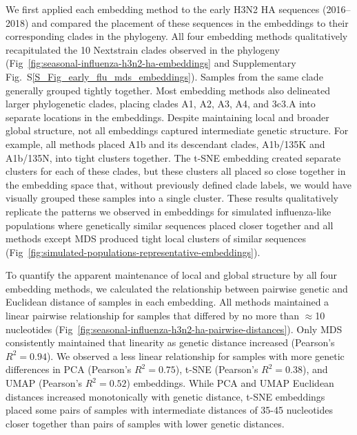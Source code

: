\documentclass[webpdf,contemporary,large,single]{oup-authoring-template}%
\theoremstyle{thmstyleone}%
\theoremstyle{thmstyletwo}%
\theoremstyle{thmstylethree}%
\begin{document}
We first applied each embedding method to the early H3N2 HA sequences (2016--2018) and compared the placement of these sequences in the embeddings to their corresponding clades in the phylogeny.
All four embedding methods qualitatively recapitulated the 10 Nextstrain clades observed in the phylogeny (Fig~\ref{fig:seasonal-influenza-h3n2-ha-embeddings} and Supplementary Fig.~S\ref{S_Fig_early_flu_mds_embeddings}).
Samples from the same clade generally grouped tightly together.
Most embedding methods also delineated larger phylogenetic clades, placing clades A1, A2, A3, A4, and 3c3.A into separate locations in the embeddings.
Despite maintaining local and broader global structure, not all embeddings captured intermediate genetic structure.
For example, all methods placed A1b and its descendant clades, A1b/135K and A1b/135N, into tight clusters together.
The t-SNE embedding created separate clusters for each of these clades, but these clusters all placed so close together in the embedding space that, without previously defined clade labels, we would have visually grouped these samples into a single cluster.
These results qualitatively replicate the patterns we observed in embeddings for simulated influenza-like populations where genetically similar sequences placed closer together and all methods except MDS produced tight local clusters of similar sequences (Fig~\ref{fig:simulated-populations-representative-embeddings}).

To quantify the apparent maintenance of local and global structure by all four embedding methods, we calculated the relationship between pairwise genetic and Euclidean distance of samples in each embedding.
All methods maintained a linear pairwise relationship for samples that differed by no more than $\approx$10 nucleotides (Fig~\ref{fig:seasonal-influenza-h3n2-ha-pairwise-distances}).
Only MDS consistently maintained that linearity as genetic distance increased (Pearson's $R^{2} = 0.94$).
We observed a less linear relationship for samples with more genetic differences in PCA (Pearson's $R^{2} = 0.75$), t-SNE (Pearson's $R^{2} = 0.38$), and UMAP (Pearson's $R^{2} = 0.52$) embeddings.
While PCA and UMAP Euclidean distances increased monotonically with genetic distance, t-SNE embeddings placed some pairs of samples with intermediate distances of 35-45 nucleotides closer together than pairs of samples with lower genetic distances.
\end{document}
